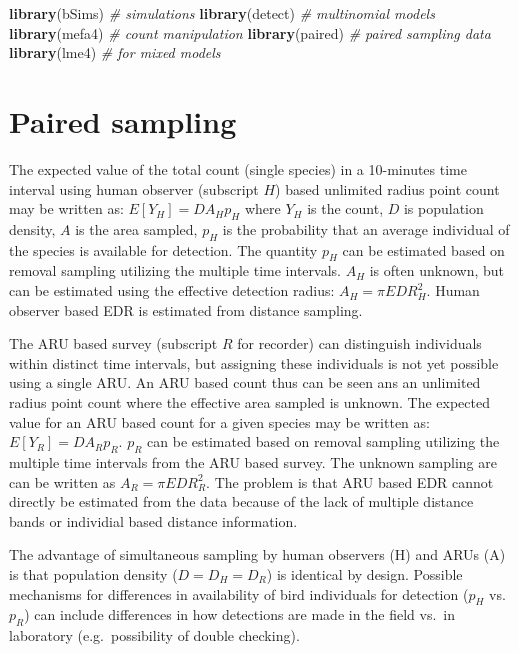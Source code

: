 \documentclass[12pt,]{book}
\newenvironment{Shaded}{\begin{snugshade}}{\end{snugshade}}
\newcommand{\CommentTok}[1]{\textcolor[rgb]{0.56,0.35,0.01}{\textit{#1}}}
\newcommand{\KeywordTok}[1]{\textcolor[rgb]{0.13,0.29,0.53}{\textbf{#1}}}
\newcommand{\NormalTok}[1]{#1}
\begin{document}
\begin{Shaded}
\begin{Highlighting}[]
\KeywordTok{library}\NormalTok{(bSims)                }\CommentTok{# simulations}
\KeywordTok{library}\NormalTok{(detect)               }\CommentTok{# multinomial models}
\KeywordTok{library}\NormalTok{(mefa4)                }\CommentTok{# count manipulation}
\KeywordTok{library}\NormalTok{(paired)               }\CommentTok{# paired sampling data}
\KeywordTok{library}\NormalTok{(lme4)                 }\CommentTok{# for mixed models}
\end{Highlighting}
\end{Shaded}

\hypertarget{paired-sampling}{%
\section{Paired sampling}\label{paired-sampling}}

The expected value of the total count (single species) in a 10-minutes time interval
using human observer (subscript \(H\)) based unlimited radius point count may be written as:
\(E[Y_{H}] = D A_{H} p_{H}\) where \(Y_{H}\) is the count, \(D\) is population density, \(A\) is
the area sampled, \(p_{H}\) is the probability that an average individual of the species
is available for detection. The quantity \(p_{H}\) can be estimated based on removal
sampling utilizing the multiple time intervals. \(A_{H}\) is often unknown, but can
be estimated using the effective detection radius: \(A_{H}=\pi EDR_{H}^2\).
Human observer based EDR is estimated from distance sampling.

The ARU based survey (subscript \(R\) for recorder)
can distinguish individuals within distinct time intervals,
but assigning these individuals is not yet possible using a single ARU.
An ARU based count thus can be seen ans an unlimited radius point count
where the effective area sampled is unknown. The expected value for an
ARU based count for a given species may be written as:
\(E[Y_{R}] = D A_{R} p_{R}\). \(p_{R}\) can be estimated based on removal
sampling utilizing the multiple time intervals from the ARU based survey.
The unknown sampling are can be written as \(A_{R}=\pi EDR_{R}^2\).
The problem is that ARU based EDR cannot directly be estimated from the data
because of the lack of multiple distance bands or individial based distance
information.

The advantage of simultaneous sampling by human observers (H) and ARUs (A)
is that population density (\(D=D_{H}=D_{R}\)) is identical by design.
Possible mechanisms for differences in availability of bird individuals for detection
(\(p_{H}\) vs. \(p_{R}\)) can include differences in how detections
are made in the field vs.~in laboratory (e.g.~possibility of double checking).
\end{document}
